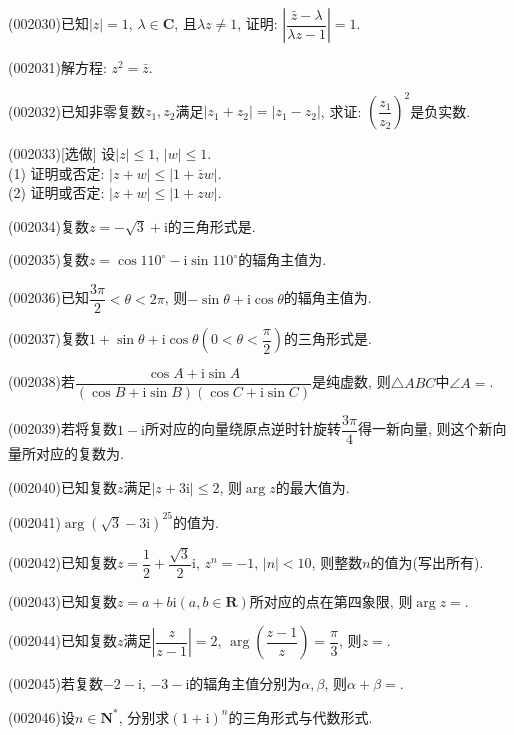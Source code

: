 \item (002030)已知$|z|=1$, $\lambda\in \mathbf{C}$, 且$\lambda z\ne 1$, 证明: $\left|\dfrac{\bar{z}-\lambda}{\lambda z-1}\right|=1$.
\item (002031)解方程: $z^2=\bar{z}$.
\item (002032)已知非零复数$z_1,z_2$满足$|z_1+z_2|=|z_1-z_2|$, 求证: $\left(\dfrac{z_1}{z_2}\right)^2$是负实数.
\item (002033)[选做]
设$|z|\le 1$, $|w|\le 1$.\\ 
(1) 证明或否定: $|z+w|\le |1+\bar{z} w|$.\\ 
(2) 证明或否定: $|z+w|\le |1+z w|$.
\item (002034)复数$z=-\sqrt{3}+\mathrm{i}$的三角形式是.
\item (002035)复数$z=\cos 110^\circ-\mathrm{i} \sin 110^\circ$的辐角主值为.
\item (002036)已知$\dfrac{3\pi}{2}<\theta<2\pi$, 则$-\sin\theta+\mathrm{i} \cos\theta$的辐角主值为.
\item (002037)复数$1+\sin\theta+\mathrm{i} \cos\theta(0<\theta<\dfrac{\pi}{2})$的三角形式是.
\item (002038)若$\dfrac{\cos A+\mathrm{i} \sin A}{(\cos B+\mathrm{i} \sin B)(\cos C+\mathrm{i} \sin C)}$是纯虚数, 则$\triangle ABC$中$\angle A=$.
\item (002039)若将复数$1-\mathrm{i}$所对应的向量绕原点逆时针旋转$\dfrac{3\pi}{4}$得一新向量, 则这个新向量所对应的复数为.
\item (002040)已知复数$z$满足$|z+3\mathrm{i}|\le 2$, 则$\arg z$的最大值为.
\item (002041)$\arg(\sqrt{3}-3\mathrm{i})^{25}$的值为.
\item (002042)已知复数$z=\dfrac{1}{2}+\dfrac{\sqrt{3}}{2}\mathrm{i}$, $z^n=-1$, $|n|<10$, 则整数$n$的值为(写出所有).
\item (002043)已知复数$z=a+b\mathrm{i}(a,b\in \mathbf{R})$所对应的点在第四象限, 则$\arg z=$.
\item (002044)已知复数$z$满足$\left|\dfrac{z}{z-1}\right|=2$, $\arg\left(\dfrac{z-1}{z}\right)=\dfrac{\pi}{3}$, 则$z=$.
\item (002045)若复数$-2-\mathrm{i}$, $-3-\mathrm{i}$的辐角主值分别为$\alpha,\beta$, 则$\alpha+\beta=$.
\item (002046)设$n\in \mathbf{N}^*$, 分别求$(1+\mathrm{i})^n$的三角形式与代数形式.
